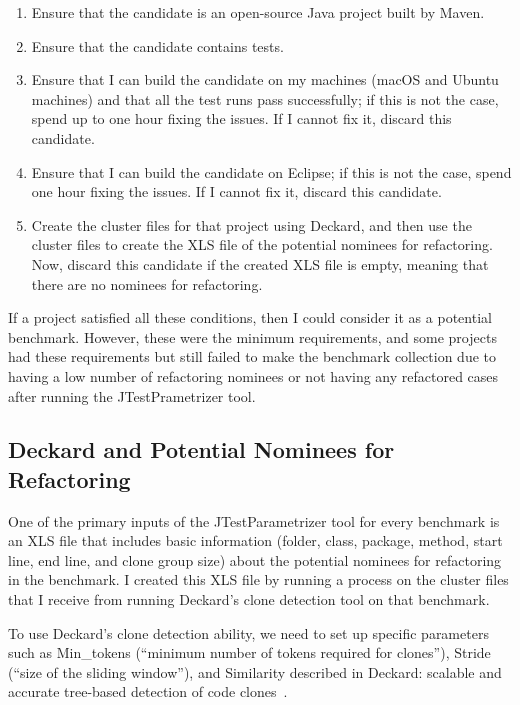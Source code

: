 \begin{enumerate}
  \item Ensure that the candidate is an open-source Java project built by Maven.
  \item Ensure that the candidate contains tests.
  \item Ensure that I can build the candidate on my machines (macOS and Ubuntu machines) and that all the test runs pass successfully; if this is not the case, spend up to one hour fixing the issues. If I cannot fix it, discard this candidate.
  \item Ensure that I can build the candidate on Eclipse; if this is not the case, spend one hour fixing the issues. If I cannot fix it, discard this candidate.
  \item Create the cluster files for that project using Deckard, and then use the cluster files to create the XLS file of the potential nominees for refactoring. Now, discard this candidate if the created XLS file is empty, meaning that there are no nominees for refactoring.
\end{enumerate}

If a project satisfied all these conditions, then I could consider it as a potential benchmark. However, these were the minimum requirements, and some projects had these requirements but still failed to make the benchmark collection due to having a low number of refactoring nominees or not having any refactored cases after running the JTestPrametrizer tool.


\subsection{Deckard and Potential Nominees for Refactoring} \label{section:deckard_explanation}

One of the primary inputs of the JTestParametrizer tool for every benchmark is an XLS file that includes basic information (folder, class, package, method, start line, end line, and clone group size) about the potential nominees for refactoring in the benchmark. I created this XLS file by running a process on the cluster files that I receive from running Deckard's clone detection tool on that benchmark.

To use Deckard's clone detection ability, we need to set up specific parameters such as {\sc Min\_tokens} (``minimum number of tokens required for clones''), {\sc Stride} (``size of the sliding window''), and {\sc Similarity} described in Deckard: scalable and accurate tree-based detection of code clones~\cite{DECKARD}.

